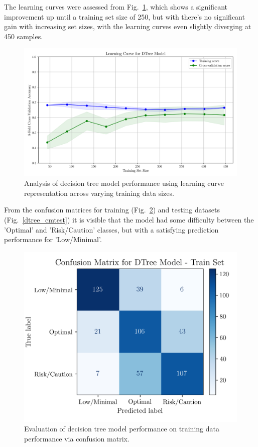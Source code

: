 \documentclass[conference]{IEEEtran}
\begin{document}
The learning curves were assessed from Fig.~\ref{dtree_lcurve}, which shows a significant improvement up until a training set size of 250, but with there's no significant gain with increasing set sizes, with the learning curves even slightly diverging at 450 samples.

\begin{figure}[H]
    \centering
    \includegraphics[width=1\linewidth]{assets/DTREE_LearningCurve.png}
    \caption{Analysis of decision tree model performance using learning curve representation across varying training data sizes.}
    \label{dtree_lcurve}
\end{figure} %

From the confusion matrices for training (Fig.~\ref{dtree_cmtrain}) and testing datasets (Fig.~\ref{dtree_cmtest}) it is visible that the model had some difficulty between the 'Optimal' and 'Risk/Caution' classes, but with a satisfying prediction performance for 'Low/Minimal'.

\begin{figure}[H]
    \centering
    \includegraphics[width=.995\linewidth]{assets/DTREE_ConfusionMatrixTrain.png}
    \caption{Evaluation of decision tree model performance on training data performance via confusion matrix.}
    \label{dtree_cmtrain}
\end{figure} %
\end{document}
